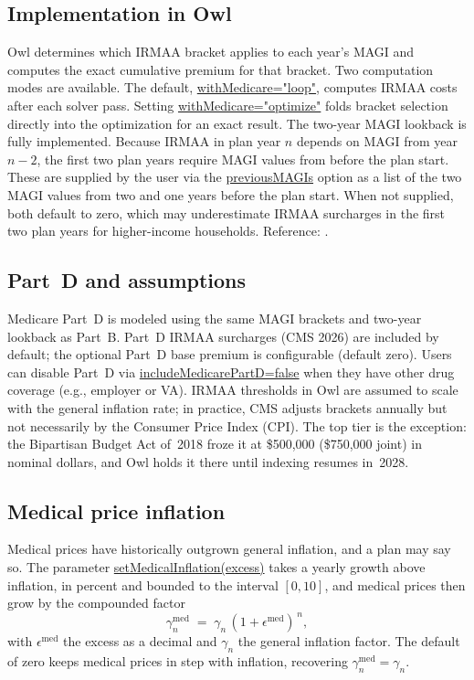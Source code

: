 \documentclass[fleqn,12pt]{report}
\newcommand{\code}[1]{\url{#1}}
\begin{document}
\subsection*{Implementation in Owl}

Owl determines which IRMAA bracket applies to each year's MAGI and computes
the exact cumulative premium for that bracket.
Two computation modes are available.
The default, \code{withMedicare="loop"}, computes IRMAA costs after each
solver pass.
Setting \code{withMedicare="optimize"} folds bracket selection
directly into the optimization for an exact result.
The two-year MAGI lookback is fully implemented.
Because IRMAA in plan year $n$ depends on MAGI from year $n-2$, the first two
plan years require MAGI values from before the plan start.
These are supplied by the user via the \code{previousMAGIs} option
as a list of the two MAGI values from two and one years before the plan start.
When not supplied, both default to zero, which may underestimate IRMAA surcharges
in the first two plan years for higher-income households.
Reference: \cite{cms2026}.

\subsection*{Part~D and assumptions}

Medicare Part~D is modeled using the same MAGI brackets and two-year lookback as Part~B.
Part~D IRMAA surcharges (CMS 2026) are included by default; the optional Part~D base
premium is configurable (default zero).
Users can disable Part~D via \code{includeMedicarePartD=false} when they have other
drug coverage (e.g., employer or VA).
IRMAA thresholds in Owl are assumed to scale with the general inflation rate;
in practice, CMS adjusts brackets annually but not necessarily by the Consumer
Price Index (CPI).
The top tier is the exception: the Bipartisan Budget Act of~2018 froze it at
\$500,000 (\$750,000 joint) in nominal dollars, and Owl holds it there until
indexing resumes in~2028.

\subsection*{Medical price inflation}
\label{Sec:MedInflation}

Medical prices have historically outgrown general inflation, and a plan may say so.
The parameter \code{setMedicalInflation(excess)} takes a yearly growth above
inflation, in percent and bounded to the interval $[0, 10]$, and medical prices
then grow by the compounded factor
\begin{equation}
    \label{Eq:MedicalInflation}
    \gamma^{\mathrm{med}}_n \;=\; \gamma_n\,(1 + \epsilon^{\mathrm{med}})^{\,n},
\end{equation}
with $\epsilon^{\mathrm{med}}$ the excess as a decimal and $\gamma_n$ the general
inflation factor.
The default of zero keeps medical prices in step with inflation, recovering
$\gamma^{\mathrm{med}}_n = \gamma_n$.
\end{document}
